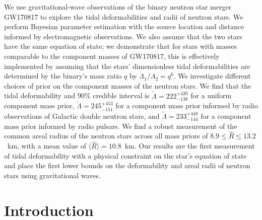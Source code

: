 We use gravitational-wave observations of the binary neutron star merger GW170817 to explore the tidal deformabilities and radii of neutron stars.
We perform Bayesian parameter estimation with the source location and distance informed by electromagnetic observations. We also assume that the two stars have the same equation of state; we demonstrate that for stars with masses comparable to the component masses of GW170817, this is effectively implemented by assuming that the stars' dimensionless tidal deformabilities are determined by the binary's mass ratio $q$ by $\Lambda_1/\Lambda_2 = q^6$. We investigate different choices of prior on the component masses of the neutron stars. We find that the tidal deformability and 90\% credible interval is $\tilde{\Lambda}=222^{+420}_{-138}$ for a uniform component mass prior, $\tilde{\Lambda}=245^{+453}_{-151}$ for a component mass prior informed by radio observations of Galactic double neutron stars, and $\tilde{\Lambda}=233^{+448}_{-144}$ for a component mass prior informed by radio pulsars. We find a robust measurement of the common areal radius of the neutron stars across all mass priors of $8.9 \le \hat{R} \le 13.2$~km, with a mean value of $\langle \hat{R} \rangle = 10.8$~km. Our results are the first measurement of tidal deformability with a physical constraint on the star's equation of state and place the first lower bounds on the deformability and areal radii of neutron stars using gravitational waves.

\section{Introduction}


